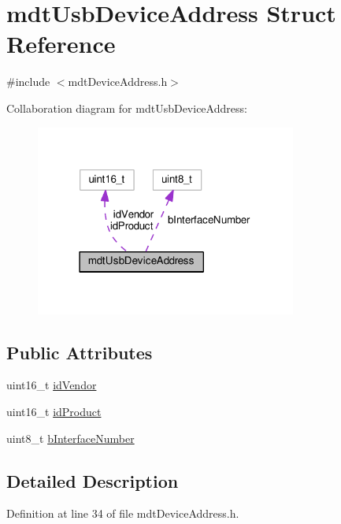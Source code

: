 \hypertarget{structmdt_usb_device_address}{\section{mdt\-Usb\-Device\-Address Struct Reference}
\label{structmdt_usb_device_address}
}


{\ttfamily \#include $<$mdt\-Device\-Address.\-h$>$}



Collaboration diagram for mdt\-Usb\-Device\-Address\-:
\nopagebreak
\begin{figure}[H]
\begin{center}
\leavevmode
\includegraphics[width=243pt]{structmdt_usb_device_address__coll__graph}
\end{center}
\end{figure}
\subsection*{Public Attributes}
\begin{DoxyCompactItemize}
\item 
uint16\-\_\-t \hyperlink{structmdt_usb_device_address_a7995bcabee1715f7e209edfc623f7a55}{id\-Vendor}
\item 
uint16\-\_\-t \hyperlink{structmdt_usb_device_address_aade64f7cb76af63da7cb493cebd614f2}{id\-Product}
\item 
uint8\-\_\-t \hyperlink{structmdt_usb_device_address_ac599e57df4f2a44e8c62791d1e5e5600}{b\-Interface\-Number}
\end{DoxyCompactItemize}


\subsection{Detailed Description}


Definition at line 34 of file mdt\-Device\-Address.\-h.



